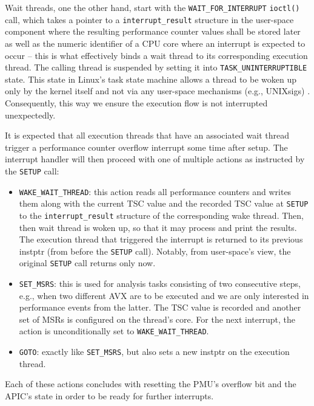 Wait threads, one the other hand, start with the \texttt{WAIT\_FOR\_INTERRUPT} \texttt{ioctl()} call, which takes a pointer to a \texttt{interrupt\_result} structure in the user-space component where the resulting performance counter values shall be stored later as well as the numeric identifier of a \gls{CPU} core where an interrupt is expected to occur -- this is what effectively binds a wait thread to its corresponding execution thread. The calling thread is suspended by setting it into \texttt{TASK\_UNINTERRUPTIBLE} state. This state in \gls{Linux}'s task state machine allows a thread to be woken up only by the kernel itself and not via any user-space mechanisms (e.g., \glspl{UNIXsig}) \cite{kernelschedheader}. Consequently, this way we ensure the execution flow is not interrupted unexpectedly.

It is expected that all execution threads that have an associated wait thread trigger a performance counter overflow interrupt some time after setup. The interrupt handler will then proceed with one of multiple actions as instructed by the \texttt{SETUP} call:\clearpage

\begin{itemize}
	\item \texttt{WAKE\_WAIT\_THREAD}: this action reads all performance counters and writes them along with the current \gls{TSC} value and the recorded \gls{TSC} value at \texttt{SETUP} to the \texttt{interrupt\_result} structure of the corresponding wake thread. Then, then wait thread is woken up, so that it may process and print the results. The execution thread that triggered the interrupt is returned to its previous \acrlong{instptr} (from before the \texttt{SETUP} call). Notably, from user-space's view, the original \texttt{SETUP} call returns only now.
	\item \texttt{SET\_MSRS}: this is used for analysis tasks consisting of two consecutive steps, e.g., when two different \gls{AVX} are to be executed and we are only interested in performance events from the latter. The \gls{TSC} value is recorded and another set of \glspl{MSR} is configured on the thread's core. For the next interrupt, the action is unconditionally set to \texttt{WAKE\_WAIT\_THREAD}.
	\item \texttt{GOTO}: exactly like \texttt{SET\_MSRS}, but also sets a new \acrlong{instptr} on the execution thread.
\end{itemize}

Each of these actions concludes with resetting the \gls{PMU}'s overflow bit and the \gls{APIC}'s state in order to be ready for further interrupts.

